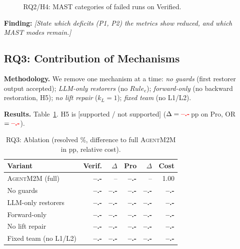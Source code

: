 \documentclass[10pt, anonymous, conference]{IEEEtran}
\theoremstyle{definition}
\theoremstyle{plain}
\theoremstyle{remark}
\newcommand{\finding}[1]{\smallskip\noindent\textbf{Finding:} \textit{#1}\smallskip}
\newcommand{\tool}{\textsc{AgentM2M}}
\newcommand{\ph}{{\color{red}\textbf{--.-}}}     %
\newcommand{\hyp}[1]{{\color{blue}#1}}           %
\newif\ifplaceholderdata \placeholderdatatrue     %
\newcommand{\phwatermark}{\ifplaceholderdata
  \node[red, opacity=0.55, font=\bfseries\scriptsize, rotate=12]
  at (rel axis cs:0.5,0.55) {PLACEHOLDER DATA};\fi}
\begin{document}
\begin{figure}[t]
\centering
{}
\caption{RQ2/H4: MAST categories of failed runs on Verified.}
\label{fig:mast}
\end{figure}

\finding{\hyp{[State which deficits (P1, P2) the metrics show reduced, and
which MAST modes remain.]}}

\subsection{RQ3: Contribution of Mechanisms}\label{subsec:rq3}
\noindent\textbf{Methodology.} We remove one mechanism at a time:
\emph{no guards} (first restorer output accepted); \emph{LLM-only restorers}
(no $\mathit{Rule}_e$); \emph{forward-only} (no backward restoration, H5);
\emph{no lift repair} ($k_L{=}1$); \emph{fixed team} (no L1/L2).

\noindent\textbf{Results.} Table~\ref{tab:ablation}. \hyp{H5 is
[supported / not supported] ($\Delta=\ph$\,pp on Pro, OR $=\ph$).}

\begin{table}[t]
\centering
\caption{RQ3: Ablation (resolved \%, difference to full \tool{} in pp,
relative cost).}
\label{tab:ablation}
\footnotesize
\setlength{\tabcolsep}{3.5pt}
\begin{tabular}{@{}l r r r r r@{}}
\toprule
Variant & Verif. & $\Delta$ & Pro & $\Delta$ & Cost \\
\midrule
\tool{} (full)         & \ph & --  & \ph & --  & 1.00 \\
No guards              & \ph & \ph & \ph & \ph & \ph \\
LLM-only restorers     & \ph & \ph & \ph & \ph & \ph \\
Forward-only           & \ph & \ph & \ph & \ph & \ph \\
No lift repair         & \ph & \ph & \ph & \ph & \ph \\
Fixed team (no L1/L2)  & \ph & \ph & \ph & \ph & \ph \\
\bottomrule
\end{tabular}
\end{table}
\end{document}
